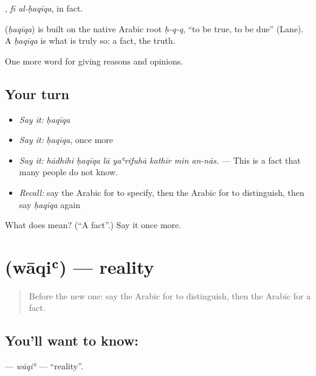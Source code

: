  , \emph{fī al-ḥaqīqa}, in fact.

\begin{cousinweb}
\textbf{} (\emph{ḥaqīqa}) is built on the native Arabic root \emph{ḥ-q-q}, \textquotedblleft{}to be true, to be due\textquotedblright{} (Lane). A \emph{ḥaqīqa} is what is truly so: a fact, the truth.
\end{cousinweb}

\begin{grammarlens}[title={What you've built}]
One more word for giving reasons and opinions.
\end{grammarlens}

\subsection*{Your turn}
\begin{itemize}
\raggedright
  \item \emph{Say it:} \emph{ḥaqīqa}
  \item \emph{Say it:} \emph{ḥaqīqa}, once more
  \item \emph{Say it:} \emph{hādhihi ḥaqīqa lā yaʿrifuhā kathīr min an-nās.} — This is a fact that many people do not know.
  \item \emph{Recall:} say the Arabic for to specify, then the Arabic for to distinguish, then say \emph{ḥaqīqa} again
\end{itemize}

\begin{tcolorbox}[breakable,colback=teal!4,colframe=teal!35!black,title={Before you move on}]
What does  mean? (\textquotedblleft{}A fact\textquotedblright{}.) Say it once more.
\end{tcolorbox}
\section[\texorpdfstring{\ar{واقع} (wāqiʿ)}{واقع (wāqiʿ)}]{ (wāqiʿ) — reality}

\label{lesson:AR-C365-waqi}



\begin{quote}
Before the new one: say the Arabic for to distinguish, then the Arabic for a fact.
\end{quote}

\subsection*{You'll want to know: }
\textbf{} — \emph{wāqiʿ} — \textquotedblleft{}reality\textquotedblright{}.

